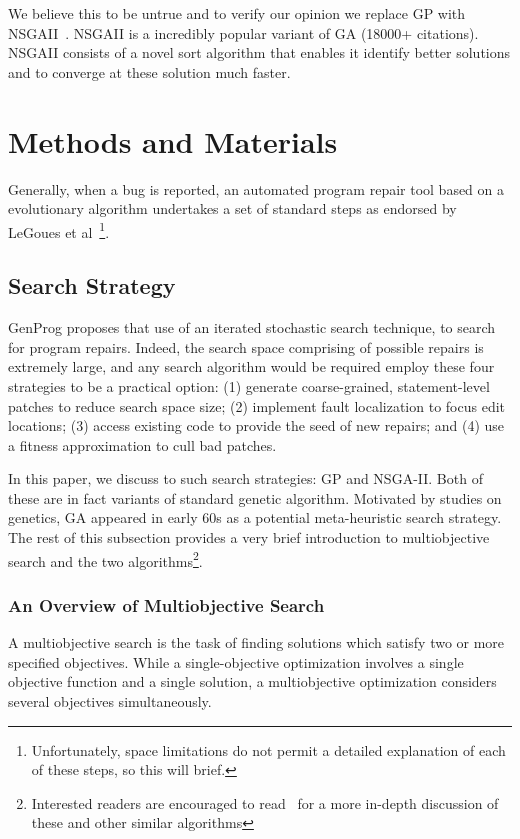 \documentclass{sig-alternate}
\theoremstyle{break}
\begin{document}


We believe this to be untrue and to verify our opinion we replace GP with NSGAII~\cite{nsgaii}. NSGAII is a incredibly popular variant of GA (18000+ citations). NSGAII consists of a novel sort algorithm that enables it identify better solutions and to converge at these solution much faster.  

\section{Methods and Materials}
\label{prelim}
Generally, when a bug is reported, an automated program repair tool based on a evolutionary algorithm undertakes a set of standard steps as endorsed by LeGoues et al~\cite{Goues}\footnote{Unfortunately, space limitations do not permit a detailed explanation of each of these steps, so this will brief.}.   


\subsection{Search Strategy}

GenProg proposes that use of an iterated stochastic search technique, to search for program repairs. Indeed, the search space comprising of possible repairs is extremely large, and any search algorithm would be required employ these four strategies to be a practical option: (1) generate coarse-grained, statement-level patches to reduce search space size; (2) implement fault localization to focus edit locations; (3) access existing code to provide the seed of new repairs; and (4) use a fitness approximation to cull bad patches.

In this paper, we discuss to such search strategies: GP and NSGA-II. Both of these are in fact variants of standard genetic algorithm. Motivated by studies on genetics, GA appeared in early 60s as a potential meta-heuristic search strategy. The rest of this subsection provides a very brief introduction to multiobjective search and the two algorithms\footnote{Interested readers are encouraged to read~\cite{clever} for a more in-depth discussion of these and other similar algorithms}.


\subsubsection{An Overview of Multiobjective Search}
\label{mos}
A multiobjective search is the task of finding solutions which satisfy two or more specified objectives. While a single-objective optimization involves a single objective function and a single solution, a multiobjective optimization considers several objectives simultaneously. 
\end{document}
